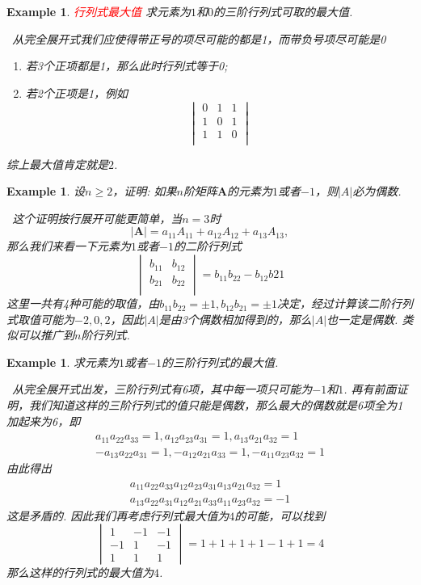 \documentclass{article}
\newtheorem{example}[theorem]{Example}
\newcommand{\hints}{{\color{blue} \text{hints}}}
\newcommand{\mbf}[1]{\bm{#1}}
\newcommand{\redt}[1]{\textcolor{red}{#1}}
\begin{document}
\begin{example}
\rm \redt{行列式最大值} 求元素为$1$和$0$的三阶行列式可取的最大值.

\hints\ 从完全展开式我们应使得带正号的项尽可能的都是1，而带负号项尽可能是0
\begin{enumerate}
	\item 若3个正项都是1，那么此时行列式等于0;
	\item 若2个正项是1，例如
	$$
	\begin{vmatrix}
	0 & 1 & 1\\
	1 & 0 & 1\\
	1 & 1 & 0\\
	\end{vmatrix}
	$$
\end{enumerate}
综上最大值肯定就是$2$. 
\end{example}

\begin{example}
\rm 设$n \geq 2$，证明: 如果$n$阶矩阵$\mbf{A}$的元素为$1$或者$-1$，则$|A|$必为偶数. 

\hints\ 这个证明按行展开可能更简单，当$n=3$时
$$
|\mbf{A}| = a_{11}A_{11} + a_{12}A_{12} +a_{13}A_{13},
$$
那么我们来看一下元素为$1$或者$-1$的二阶行列式
$$
\begin{vmatrix}
b_{11} & b_{12} \\
b_{21} & b_{22} \\
\end{vmatrix}  = b_{11}b_{22} - b_{12}b{21}
$$
这里一共有4种可能的取值，由$b_{11}b_{22} = \pm 1, b_{12}b_{21} = \pm 1$决定，经过计算该二阶行列式取值可能为$-2,0,2$，因此$|A|$是由3个偶数相加得到的，那么$|A|$也一定是偶数. 类似可以推广到$n$阶行列式. 
\end{example}

\begin{example}
\rm 求元素为$1$或者$-1$的三阶行列式的最大值. 

\hints\ 从完全展开式出发，三阶行列式有6项，其中每一项只可能为$-1$和$1$. 再有前面证明，我们知道这样的三阶行列式的值只能是偶数，那么最大的偶数就是6项全为1加起来为6，即
$$
\begin{array}{ll}
a_{11}a_{22}a_{33} = 1, a_{12}a_{23}a_{31} = 1, a_{13}a_{21}a_{32} = 1 \\
-a_{13}a_{22}a_{31} = 1, -a_{12}a_{21}a_{33} = 1, -a_{11}a_{23}a_{32} = 1 
\end{array}
$$
由此得出
$$
\begin{array}{ll}
a_{11}a_{22}a_{33}a_{12}a_{23}a_{31}a_{13}a_{21}a_{32} = 1 \\
a_{13}a_{22}a_{31}a_{12}a_{21}a_{33}a_{11}a_{23}a_{32} = -1 
\end{array}
$$
这是矛盾的. 因此我们再考虑行列式最大值为$4$的可能，可以找到
$$
\begin{vmatrix}
1 & -1 & -1\\
-1 & 1 & -1 \\
1 & 1 & 1 
\end{vmatrix} = 1 + 1 + 1 + 1 - 1 + 1 = 4
$$
那么这样的行列式的最大值为$4$. 
\end{example}
\end{document}

